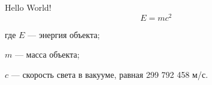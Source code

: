 Hello World!
\begin{equation}
E=mc^2
\end{equation}
\begin{explanationx}
\item[где] $E$ --- энергия объекта;
\item  $m$ --- масса объекта;
\item  $c$ --- скорость света в вакууме, равная 299 792 458 м/с.
\end{explanationx}
